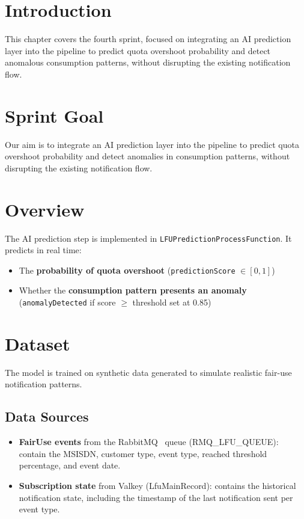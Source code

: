 

\section{Introduction}
This chapter covers the fourth sprint, focused on integrating an AI prediction layer into the pipeline to predict quota overshoot probability and detect anomalous consumption patterns, without disrupting the existing notification flow.


\section{Sprint Goal}

Our aim is to integrate an AI prediction layer into the pipeline to predict quota overshoot probability and detect anomalies in consumption patterns, without disrupting the existing notification flow.


\section{Overview}

The AI prediction step is implemented in \texttt{LFUPredictionProcessFunction}. It predicts in real time:
\begin{itemize}
    \item The \textbf{probability of quota overshoot} (\texttt{predictionScore} $\in [0, 1]$)
    \item Whether the \textbf{consumption pattern presents an anomaly} (\texttt{anomalyDetected} if score $\geq$ threshold set at 0.85)
\end{itemize}


\section{Dataset}

The model is trained on synthetic data generated to simulate realistic fair-use notification patterns.

\subsection{Data Sources}
\begin{itemize}
    \item[-] \textbf{FairUse events} from the RabbitMQ~\cite{RBMQ} queue (RMQ\_LFU\_QUEUE): contain the MSISDN, customer type, event type, reached threshold percentage, and event date.
    \item[-] \textbf{Subscription state} from Valkey (LfuMainRecord): contains the historical notification state, including the timestamp of the last notification sent per event type.
\end{itemize}

